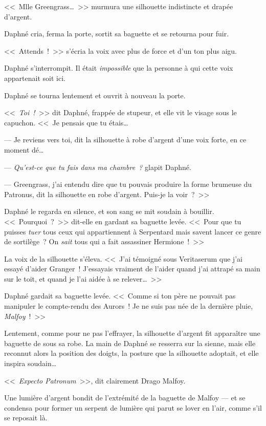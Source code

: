 <<~Mlle Greengrass…~>> murmura une silhouette indistincte et drapée d'argent.

Daphné cria, ferma la porte, sortit sa baguette et se retourna pour fuir.

<<~Attends~!~>> s'écria la voix avec plus de force et d'un ton plus aigu.

Daphné s'interrompit. Il était \emph{impossible} que la personne à qui cette voix appartenait soit ici.

Daphné se tourna lentement et ouvrit à nouveau la porte.

<<~\emph{Toi~!}~>> dit Daphné, frappée de stupeur, et elle vit le visage sous le capuchon. <<~Je pensais que tu étais…

--- Je reviens vers toi, dit la silhouette à robe d'argent d'une voix forte, en ce moment dé…

--- \emph{Qu'est-ce que tu fais dans ma chambre~?} glapit Daphné.

--- Greengrass, j'ai entendu dire que tu pouvais produire la forme brumeuse du Patronus, dit la silhouette en robe d'argent. Puis-je la voir~?~>>

Daphné le regarda en silence, et son sang se mit soudain à bouillir. <<~Pourquoi~?~>> dit-elle en gardant sa baguette levée. <<~Pour que tu puisses \emph{tuer} tous ceux qui appartiennent à Serpentard mais savent lancer ce genre de sortilège~? On \emph{sait} tous qui a fait assassiner Hermione~!~>>

La voix de la silhouette s'éleva. <<~J'ai témoigné sous Veritaserum que j'ai essayé d'aider Granger~! J'essayais vraiment de l'aider quand j'ai attrapé sa main sur le toit, et quand je l'ai aidée à se relever…~>>

Daphné gardait sa baguette levée. <<~Comme si ton père ne pouvait pas manipuler le compte-rendu des Aurors~! Je ne suis pas née de la dernière pluie, \emph{Malfoy}~!~>>

Lentement, comme pour ne pas l'effrayer, la silhouette d'argent fit apparaître une baguette de sous sa robe. La main de Daphné se resserra sur la sienne, mais elle reconnut alors la position des doigts, la posture que la silhouette adoptait, et elle inspira soudain…

<<~\emph{Expecto Patronum}~>>, dit clairement Drago Malfoy.

Une lumière d'argent bondit de l'extrémité de la baguette de Malfoy — et se condensa pour former un serpent de lumière qui parut se lover en l'air, comme s'il se reposait là.

